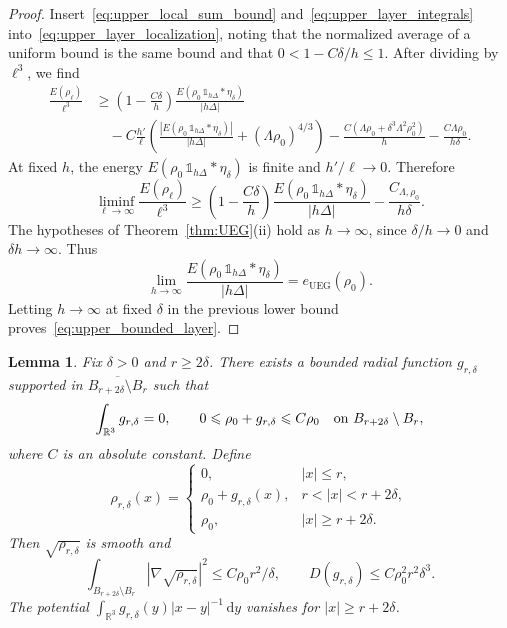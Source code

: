 \documentclass[final,reqno]{amsart}
\newtheorem{lemma}[theorem]{Lemma}
\theoremstyle{remark}
\theoremstyle{definition}
\renewcommand{\le}{\leqslant}
\renewcommand{\ge}{\geqslant}
\newcommand{\RR}{\mathbb{R}}
\newcommand{\iden}{\mathbb{1}}
\newcommand{\UEG}{\mathrm{UEG}}
\newcommand{\tetra}{\mathbb{\Delta}}
\begin{document}
\begin{proof}
Insert~\eqref{eq:upper_local_sum_bound} and~\eqref{eq:upper_layer_integrals} into~\eqref{eq:upper_layer_localization}, noting that the normalized average of a uniform bound is the same bound and that $0<1-C\delta/h\le1$. After dividing by $\ell^3$, we find
\begin{align*}
\frac{E(\rho_\ell)}{\ell^3}
&\ge\left(1-\frac{C\delta}h\right)\frac{E(\rho_0\,\iden_{h\tetra}*\eta_\delta)}{|h\tetra|}\\
&\quad-C\frac{h'}{\ell}
\left(\frac{|E(\rho_0\,\iden_{h\tetra}*\eta_\delta)|}{|h\tetra|}+(\Lambda\rho_0)^{4/3}\right)
-\frac{C(\Lambda\rho_0+\delta^3\Lambda^2\rho_0^2)}h
-\frac{C\Lambda\rho_0}{h\delta}.
\end{align*}
At fixed $h$, the energy $E(\rho_0\,\iden_{h\tetra}*\eta_\delta)$ is finite and $h'/\ell\to0$. Therefore
\[
\liminf_{\ell\to\infty}\frac{E(\rho_\ell)}{\ell^3}
\ge\left(1-\frac{C\delta}h\right)\frac{E(\rho_0\,\iden_{h\tetra}*\eta_\delta)}{|h\tetra|}
-\frac{C_{\Lambda,\rho_0}}{h\delta}.
\]
 The hypotheses of Theorem~\ref{thm:UEG}(ii) hold as $h\to\infty$, since $\delta/h\to0$ and $\delta h\to\infty$. Thus
\[
\lim_{h\to\infty}\frac{E(\rho_0\,\iden_{h\tetra}*\eta_\delta)}{|h\tetra|}=e_\UEG(\rho_0).
\]
Letting $h\to\infty$ at fixed $\delta$ in the previous lower bound proves~\eqref{eq:upper_bounded_layer}.
\end{proof}

\begin{lemma}\label{lem:upper_collar}
Fix $\delta>0$ and $r\ge2\delta$. There exists a bounded radial function $g_{r,\delta}$ supported in $\overline{B_{r+2\delta}\setminus B_r}$ such that
\begin{equation}\label{eq:upper_collar_charge}
\int_{\RR^3}g_{r,\delta}=0,
\qquad
0\le\rho_0+g_{r,\delta}\le C\rho_0
\quad\hbox{on }B_{r+2\delta}\setminus B_r,
\end{equation}
where $C$ is an absolute constant. Define
\[
\rho_{r,\delta}(x)=
\begin{cases}
0,&|x|\le r,\\
\rho_0+g_{r,\delta}(x),&r<|x|<r+2\delta,\\
\rho_0,&|x|\ge r+2\delta.
\end{cases}
\]
Then $\sqrt{\rho_{r,\delta}}$ is smooth and
\begin{equation}\label{eq:upper_collar_costs}
\int_{B_{r+2\delta}\setminus B_r}|\nabla\sqrt{\rho_{r,\delta}}|^2
\le C\rho_0r^2/\delta,
\qquad
D(g_{r,\delta})\le C\rho_0^2r^2\delta^3.
\end{equation}
The potential $\int_{\RR^3}g_{r,\delta}(y)|x-y|^{-1}\,\mathrm dy$ vanishes for $|x|\ge r+2\delta$.
\end{lemma}
\end{document}
